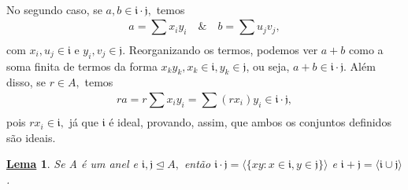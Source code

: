 \documentclass{article}
\newtheorem*{lemma*}{\underline{Lema}}
\begin{document}
No segundo caso, se \(a, b\in \mathfrak{i}\cdot \mathfrak{j},\) temos 
\[
  a = \sum\limits_{}^{}x_{i}y_{i}\quad\&\quad b = \sum\limits_{}^{}u_{j}v_{j},
\]
com \(x_{i}, u_{j}\in \mathfrak{i}\) e \(y_{i}, v_{j}\in \mathfrak{j}.\) Reorganizando os termos, podemos ver
\(a+b\) como a soma finita de termos da forma \(x_{k}y_{k}, x_{k}\in \mathfrak{i}, y_{k}\in \mathfrak{j}\), ou seja, 
\(a+b\in \mathfrak{i}\cdot \mathfrak{j}\). Além disso, se \(r\in A,\) temos 
\[
  ra = r \sum\limits_{}^{}x_{i}y_{i} = \sum\limits_{}^{}(rx_{i})y_{i}\in \mathfrak{i}\cdot \mathfrak{j},
\]
pois \(rx_{i}\in \mathfrak{i},\) já que \(\mathfrak{i}\) é ideal, provando, assim, que ambos os conjuntos definidos são ideais.
\begin{lemma*}
  Se A é um anel e \(\mathfrak{i}, \mathfrak{j}\trianglelefteq{A},\) então \(\mathfrak{i}\cdot \mathfrak{j}=\langle \{xy: x\in \mathfrak{i}, y\in \mathfrak{j}\} \rangle\) e
  \(\mathfrak{i}+\mathfrak{j} = \langle \mathfrak{i}\cup \mathfrak{j} \rangle\).
\end{lemma*}
\end{document}
